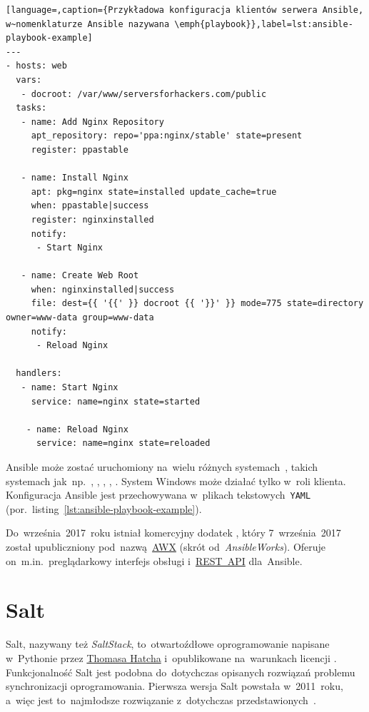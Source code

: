 \documentclass[thesis]{subfiles}
\begin{document}
\begin{lstlisting}[language=,caption={Przykładowa konfiguracja klientów serwera Ansible, w~nomenklaturze Ansible nazywana \emph{playbook}},label=lst:ansible-playbook-example]
---
- hosts: web
  vars:
   - docroot: /var/www/serversforhackers.com/public
  tasks:
   - name: Add Nginx Repository
     apt_repository: repo='ppa:nginx/stable' state=present
     register: ppastable

   - name: Install Nginx
     apt: pkg=nginx state=installed update_cache=true
     when: ppastable|success
     register: nginxinstalled
     notify:
      - Start Nginx

   - name: Create Web Root
     when: nginxinstalled|success
     file: dest={{ '{{' }} docroot {{ '}}' }} mode=775 state=directory owner=www-data group=www-data
     notify:
      - Reload Nginx

  handlers:
   - name: Start Nginx
     service: name=nginx state=started

    - name: Reload Nginx
      service: name=nginx state=reloaded
\end{lstlisting}

Ansible może zostać uruchomiony na~wielu różnych systemach~, takich systemach jak~np.~, \emph{\debian{}}, , , . System Windows może działać tylko w~roli klienta. Konfiguracja Ansible jest przechowywana w~plikach tekstowych~\texttt{YAML} (por.~listing~\ref{lst:ansible-playbook-example}).

Do~września~2017~roku istniał komercyjny dodatek , który 7~września~2017 został upubliczniony pod~nazwą~\href{https://github.com/ansible/awx}{AWX} (skrót od~\emph{AnsibleWorks}). Oferuje on~m.in.~preglądarkowy interfejs obsługi i~\href{https://en.wikipedia.org/wiki/Representational_state_transfer}{REST~API} dla~Ansible.


\section{Salt}
\label{sec:salt}

Salt, nazywany też \emph{SaltStack}, to~otwartoźdłowe oprogramowanie napisane w~Pythonie przez \href{https://www.linkedin.com/in/thhatch/}{Thomasa Hatcha} i~opublikowane na~warunkach licencji . Funkcjonalność Salt jest podobna do~dotychczas opisanych rozwiązań problemu synchronizacji oprogramowania. Pierwsza wersja Salt powstała w~2011~roku, a~więc jest to~najmłodsze rozwiązanie z~dotychczas przedstawionych~\cite{saltstack}.
\end{document}
